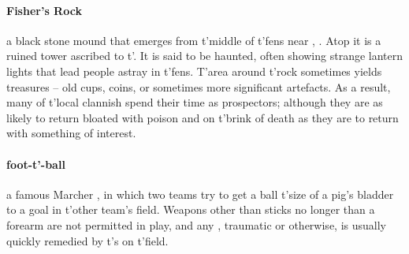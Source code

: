 \paragraph{Fisher’s Rock} a black stone mound that emerges from t'\allowbreak middle of t'\allowbreak fens near , . Atop it is a ruined tower ascribed to t'\allowbreak {}. It is said to be haunted, often showing strange lantern lights that lead people astray in t'\allowbreak fens. T'area around t'\allowbreak rock sometimes yields treasures – old cups, coins, or sometimes more significant artefacts. As a result, many of t'\allowbreak local clannish  spend their time as prospectors; although they are as likely to return bloated with poison and on t'\allowbreak brink of death as they are to return with something of interest. 
\paragraph{foot-t'-ball} a famous Marcher , in which two teams try to get a ball t'\allowbreak size of a pig's bladder to a goal in t'\allowbreak other team's field. Weapons other than sticks no longer than a forearm are not permitted in play, and any , traumatic or otherwise, is usually quickly remedied by t'\allowbreak {}s on t'\allowbreak field.
